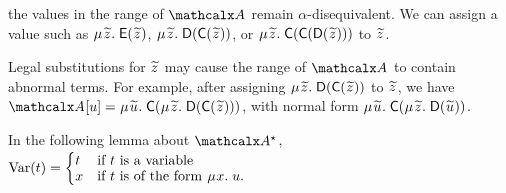 \begin{examplex}
the values in the range of $\Val$ remain $\alpha$-disequivalent.
We can assign a value such as
$\MU {\Varec{z}}.\; \const{E}( {\Varec{z}} )$,
$\MU {\Varec{z}}.\; \const{D}( \const{C}( {\Varec{z}} ) )$, or
$\MU {\Varec{z}}.\; \const{C}( \const{C}( \const{D}( {\Varec{z}} ) ) )$
to ${\Varec{z}}$.
\begin{rep}Legal substitutions for ${\Varec{z}}$ may cause the range of $\Val$ to contain abnormal terms.
For example, after assigning $\MU {\Varec{z}}.\; \const{D}( \const{C}( {\Varec{z}} ) )$ to $\Varec{z}$, we have
$\Val \ec{u} = \MU {\Varec{u}}.\; \const{C}( \MU {\Varec{z}}.\; \const{D}( \const{C}( {\Varec{z}} ) ) )$,
with normal form
$\MU {\Varec{u}}.\; \const{C}( \MU {\Varec{z}}.\; \const{D}( {\Varec{u}} ) )$.\end{rep}
\xend
\end{examplex}

In the following lemma about $\ValC$,
$\vphantom{\Bigl(_j}\muvar( t ) = \relax{\begin{cases}
  t & \text{if $t$ is a variable} \\[-\jot]
  x & \text{if $t$ is of the form $\MU {x}.\; u$.}
\end{cases}}$

%

